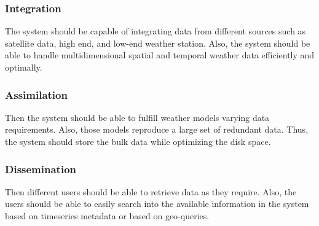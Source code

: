 \subsubsection{Integration }
The system should be capable of integrating data from different sources such as satellite data, high end, and low-end weather station. Also, the system should be able to handle multidimensional spatial and temporal weather data efficiently and optimally.
\subsubsection{Assimilation}
Then the system should be able to fulfill weather models varying data requirements. Also, those models reproduce a large set of redundant data. Thus, the system should store the bulk data while optimizing the disk space.
\subsubsection{Dissemination}
Then different users should be able to retrieve data as they require. Also, the users should be able to easily search into the available information in the system based on timeseries metadata or based on geo-queries.
